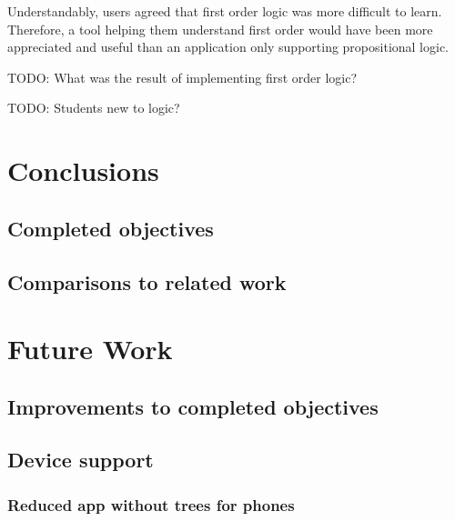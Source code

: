 \documentclass{report}
\begin{document}
Understandably, users agreed that first order logic was more difficult to learn. Therefore, a tool helping them understand first order would have been more appreciated and useful than an application only supporting propositional logic.

TODO: What was the result of implementing first order logic?

TODO: Students new to logic?



\chapter{Conclusions}
\section{Completed objectives}
\section{Comparisons to related work}

\chapter{Future Work}
\section{Improvements to completed objectives}

\section{Device support}
\subsection{Reduced app without trees for phones}
\end{document}
